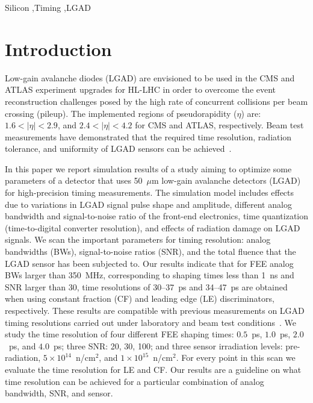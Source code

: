 \documentclass[preprint,1p]{elsarticle}
\begin{document}
\begin{frontmatter}
\begin{keyword}

Silicon \sep Timing \sep LGAD

\end{keyword}

\end{frontmatter}

\tableofcontents


\section{Introduction}

Low-gain avalanche diodes (LGAD) are envisioned to be used in the CMS and ATLAS experiment upgrades for HL-LHC in order to overcome
the event reconstruction challenges posed by the high rate of concurrent
collisions per beam crossing (pileup). The implemented regions of pseudorapidity ($\eta$)
are: $1.6< |\eta| <2.9$, and $2.4< |\eta|<4.2$ for CMS and ATLAS, respectively.
 Beam test measurements have demonstrated that the required time resolution,
radiation tolerance, and uniformity of LGAD sensors can be achieved~\cite{Apresyan:2018oln}.

In this paper we report simulation results of a study aiming to optimize some
parameters of a detector that uses 50~$\mu$m low-gain avalanche detectors (LGAD) for
high-precision timing measurements. The simulation model includes effects due to variations in LGAD signal pulse shape and amplitude,
different analog bandwidth and signal-to-noise ratio of the front-end electronics, time
quantization (time-to-digital converter resolution), and effects of radiation damage on LGAD signals.
We scan the important parameters for timing resolution: analog bandwidths (BWs),
signal-to-noise ratios (SNR), and the total fluence that the LGAD sensor has been subjected to.
Our results indicate that for FEE analog BWs larger than 350~\si{MHz},
corresponding to shaping times less than 1~\si{ns} and SNR larger than 30, time resolutions of 30--37~\si{ps} and 34--47~\si{ps}
are obtained when using constant fraction (CF) and leading edge (LE) discriminators, respectively.
These results are compatible with previous measurements on LGAD timing resolutions carried out under
laboratory and beam test conditions~\cite{Apresyan:2018oln, Cartiglia201783, PELLEGRINI201412}.
We study the time resolution of four different FEE shaping times: $0.5$~\si{ps}, $1.0$~\si{ps},
$2.0$~\si{ps}, and $4.0$~\si{ps}; three SNR: 20, 30, 100; and three sensor irradiation
levels: pre-radiation, $5\times 10^{14}$~n/cm$^2$, and $1\times 10^{15}$~n/cm$^2$.
For every point in this scan we evaluate the time resolution for LE and CF.
Our results are a guideline on what time resolution can
be achieved for a particular combination of analog bandwidth, SNR, and sensor.
\end{document}
